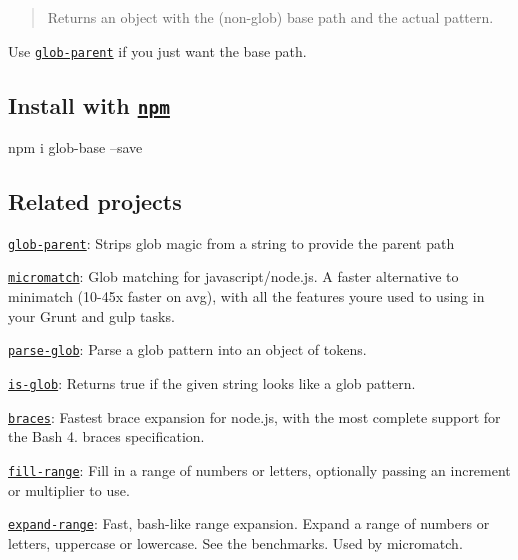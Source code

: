 \begin{quote}
Returns an object with the (non-\/glob) base path and the actual pattern. \end{quote}


Use \href{https://github.com/es128/glob-parent}{\tt glob-\/parent} if you just want the base path.

\subsection*{Install with \href{npmjs.org}{\tt npm}}


\begin{DoxyCode}
npm i glob-base --save
\end{DoxyCode}


\subsection*{Related projects}


\begin{DoxyItemize}
\item \href{https://github.com/es128/glob-parent}{\tt glob-\/parent}\+: Strips glob magic from a string to provide the parent path
\item \href{https://github.com/jonschlinkert/micromatch}{\tt micromatch}\+: Glob matching for javascript/node.\+js. A faster alternative to minimatch (10-\/45x faster on avg), with all the features you\textquotesingle{}re used to using in your Grunt and gulp tasks.
\item \href{https://github.com/jonschlinkert/parse-glob}{\tt parse-\/glob}\+: Parse a glob pattern into an object of tokens.
\item \href{https://github.com/jonschlinkert/is-glob}{\tt is-\/glob}\+: Returns {\ttfamily true} if the given string looks like a glob pattern.
\item \href{https://github.com/jonschlinkert/braces}{\tt braces}\+: Fastest brace expansion for node.\+js, with the most complete support for the Bash 4. braces specification.
\item \href{https://github.com/jonschlinkert/fill-range}{\tt fill-\/range}\+: Fill in a range of numbers or letters, optionally passing an increment or multiplier to use.
\item \href{https://github.com/jonschlinkert/expand-range}{\tt expand-\/range}\+: Fast, bash-\/like range expansion. Expand a range of numbers or letters, uppercase or lowercase. See the benchmarks. Used by micromatch.
\end{DoxyItemize}

